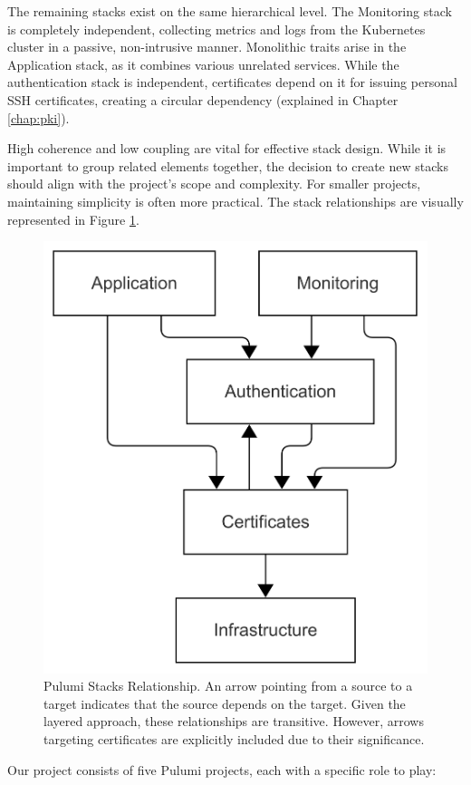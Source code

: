 The remaining stacks exist on the same hierarchical level. The Monitoring stack is completely independent, collecting metrics and logs from the Kubernetes cluster in a passive, non-intrusive manner. Monolithic traits arise in the Application stack, as it combines various unrelated services. While the authentication stack is independent, certificates depend on it for issuing personal SSH certificates, creating a circular dependency (explained in Chapter \ref{chap:pki}).

High coherence and low coupling are vital for effective stack design. While it is important to group related elements together, the decision to create new stacks should align with the project's scope and complexity. For smaller projects, maintaining simplicity is often more practical. The stack relationships are visually represented in Figure \ref{fig:pulumi_stacks}.

\begin{figure}[h]
    \centering
    \includegraphics[width=.5\textwidth]{images/pulumi_stacks.png}
    \caption{Pulumi Stacks Relationship. An arrow pointing from a source to a target indicates that the source depends on the target. Given the layered approach, these relationships are transitive. However, arrows targeting certificates are explicitly included due to their significance.}
    \label{fig:pulumi_stacks}
\end{figure}

Our project consists of five Pulumi projects, each with a specific role to play:

